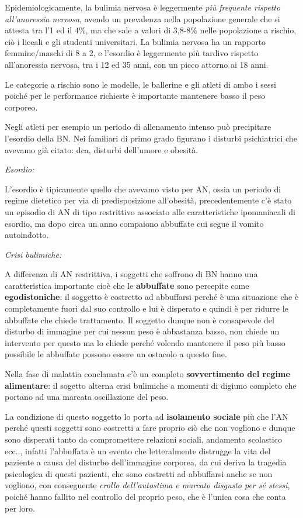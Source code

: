 \documentclass[]{article}
\begin{document}
Epidemiologicamente, la bulimia nervosa è leggermente \emph{più
frequente rispetto all'anoressia nervosa}, avendo un prevalenza nella
popolazione generale che si attesta tra l'1 ed il 4\%, ma che sale a
valori di 3,8-8\% nelle popolazione a rischio, ciò i liceali e gli
studenti universitari. La bulimia nervosa ha un rapporto femmine/maschi
di 8 a 2, e l'esordio è leggermente più tardivo rispetto all'anoressia
nervosa, tra i 12 ed 35 anni, con un picco attorno ai 18 anni.

Le categorie a rischio sono le modelle, le ballerine e gli atleti di
ambo i sessi poiché per le performance richieste è importante mantenere
basso il peso corporeo.

Negli atleti per esempio un periodo di allenamento intenso può
precipitare l'esordio della BN. Nei familiari di primo grado figurano i
disturbi psichiatrici che avevamo già citato: dca, disturbi dell'umore e
obesità.

\emph{\emph{Esordio:}}

L'esordio è tipicamente quello che avevamo visto per AN, ossia un
periodo di regime dietetico per via di predisposizione all'obesità,
precedentemente c'è stato un episodio di AN di tipo restrittivo
associato alle caratteristiche ipomaniacali di esordio, ma dopo circa un
anno compaiono abbuffate cui segue il vomito autoindotto.

\emph{\emph{Crisi bulimiche:}}

A differenza di AN restrittiva, i soggetti che soffrono di BN hanno una
caratteristica importante cioè che le \textbf{abbuffate} sono percepite
come \textbf{egodistoniche}: il soggetto è costretto ad abbuffarsi
perché è una situazione che è completamente fuori dal suo controllo e
lui è disperato e quindi è per ridurre le abbuffate che chiede
trattamento. Il soggetto dunque non è consapevole del disturbo di
immagine per cui nessun peso è abbastanza basso, non chiede un
intervento per questo ma lo chiede perché volendo mantenere il peso più
basso possibile le abbuffate possono essere un ostacolo a questo fine.

Nella fase di malattia conclamata c'è un completo \textbf{sovvertimento
del regime alimentare}: il sogetto alterna crisi bulimiche a momenti di
digiuno completo che portano ad una marcata oscillazione del peso.

La condizione di questo soggetto lo porta ad \textbf{isolamento sociale}
più che l'AN perché questi soggetti sono costretti a fare proprio ciò
che non vogliono e dunque sono disperati tanto da compromettere
relazioni sociali, andamento scolastico ecc.., infatti l'abbuffata è un
evento che letteralmente distrugge la vita del paziente a causa del
disturbo dell'immagine corporea, da cui deriva la tragedia psicologica
di questi pazienti, che sono costretti ad abbuffarsi anche se non
vogliono, con conseguente \emph{crollo dell'autostima e marcato disgusto
per sé stessi}, poiché hanno fallito nel controllo del proprio peso, che
è l'unica cosa che conta per loro.
\end{document}
